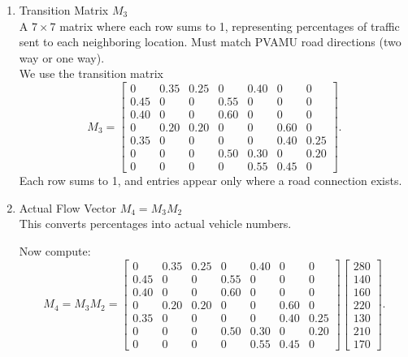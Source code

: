 \documentclass{ximera}
\begin{document}
\begin{enumerate}
    \item Transition Matrix $M_3$\\
    A $7\times 7$ matrix where each row sums to 1, representing percentages of traffic sent to each neighboring location. Must match PVAMU road directions (two way or one way).\\

    We use the transition matrix
    \[
    M_3=
    \begin{bmatrix}
    0&0.35&0.25&0&0.40&0&0\\
    0.45&0&0&0.55&0&0&0\\
    0.40&0&0&0.60&0&0&0\\
    0&0.20&0.20&0&0&0.60&0\\
    0.35&0&0&0&0&0.40&0.25\\
    0&0&0&0.50&0.30&0&0.20\\
    0&0&0&0&0.55&0.45&0
    \end{bmatrix}.
    \]
    Each row sums to 1, and entries appear only where a road connection exists.

    \item Actual Flow Vector $M_4=M_3 M_2$\\
    This converts percentages into actual vehicle numbers.

    Now compute:
    \[
    M_4=M_3M_2
    =
    \begin{bmatrix}
    0&0.35&0.25&0&0.40&0&0\\
    0.45&0&0&0.55&0&0&0\\
    0.40&0&0&0.60&0&0&0\\
    0&0.20&0.20&0&0&0.60&0\\
    0.35&0&0&0&0&0.40&0.25\\
    0&0&0&0.50&0.30&0&0.20\\
    0&0&0&0&0.55&0.45&0
    \end{bmatrix}
    \begin{bmatrix}
    280\\
    140\\
    160\\
    220\\
    130\\
    210\\
    170
    \end{bmatrix}.
    \]


\end{enumerate}
\end{document}
